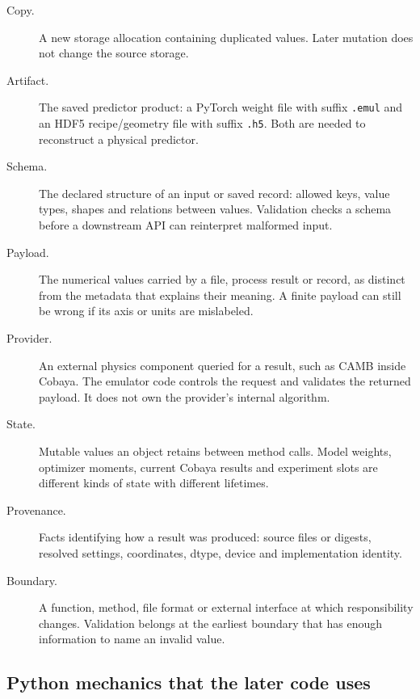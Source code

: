 \documentclass[10pt,aps,prd,twocolumn,nofootinbib]{revtex4-2}
\newcommand{\code}[1]{\texttt{#1}}
\begin{document}
\begin{description}
  \item[Copy.] A new storage allocation containing duplicated values.  Later
  mutation does not change the source storage.

  \item[Artifact.] The saved predictor product: a PyTorch weight file with
  suffix \code{.emul} and an HDF5 recipe/geometry file with suffix
  \code{.h5}.  Both are needed to reconstruct a physical predictor.

  \item[Schema.] The declared structure of an input or saved record: allowed
  keys, value types, shapes and relations between values.  Validation checks
  a schema before a downstream API can reinterpret malformed input.

  \item[Payload.] The numerical values carried by a file, process result or
  record, as distinct from the metadata that explains their meaning.  A
  finite payload can still be wrong if its axis or units are mislabeled.

  \item[Provider.] An external physics component queried for a result, such as
  CAMB inside Cobaya.  The emulator code controls the request and validates
  the returned payload.  It does not own the provider's internal algorithm.

  \item[State.] Mutable values an object retains between method calls.  Model
  weights, optimizer moments, current Cobaya results and experiment slots are
  different kinds of state with different lifetimes.

  \item[Provenance.] Facts identifying how a result was produced: source
  files or digests, resolved settings, coordinates, dtype, device and
  implementation identity.

  \item[Boundary.] A function, method, file format or external interface at
  which responsibility changes.  Validation belongs at the earliest boundary
  that has enough information to name an invalid value.
\end{description}

\subsection{Python mechanics that the later code uses}
\end{document}
